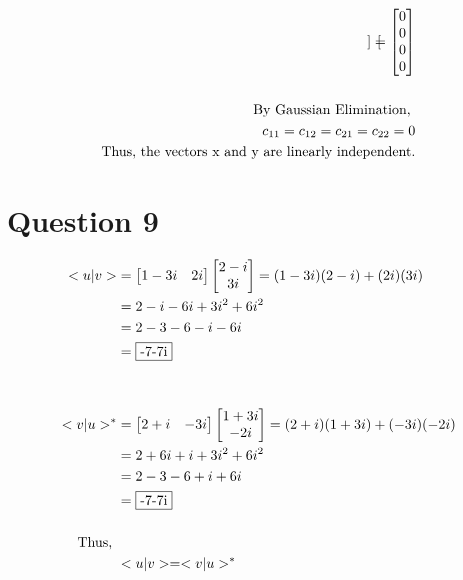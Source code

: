 \documentclass{article}
\begin{document}
\begin{align*}
\begin{bmatrix}
\end{bmatrix}
= 
\begin{bmatrix}
0 \\ 0 \\ 0 \\ 0
\end{bmatrix} \\ \\ 
\text{By Gaussian Elimination, } \\ 
c\textsubscript{11} = c\textsubscript{12} = c\textsubscript{21} = c\textsubscript{22} = 0 \\ 
\text{Thus, the vectors x and y are linearly independent.}
\end{align*}

\section{Question 9}  
\begin{align*}
    <u|v> &= \begin{bmatrix}
    1-3i & 2i 
    \end{bmatrix}
    \begin{bmatrix}
    2-i \\ 3i 
    \end{bmatrix} = (1-3i)(2-i) + (2i)(3i) \\ &= 2 - i - 6i + 3i^2 + 6i^2 \\ &= 2 - 3 - 6 - i - 6i \\ &= \fbox{-7-7i} \\ \\ \\ 
    <v|u>^{*} &= \begin{bmatrix}
    2+i & -3i
    \end{bmatrix} 
    \begin{bmatrix}
    1+3i \\ -2i 
    \end{bmatrix}
    = (2+i)(1+3i) + (-3i)(-2i) \\ &= 2 + 6i + i + 3i^2 + 6i^2 \\ &= 2 - 3 - 6 + i + 6i \\ &= \fbox{-7-7i} \\ \\ \text{Thus, } \\ &<u|v> = <v|u>^{*}
\end{align*}
\end{document}
